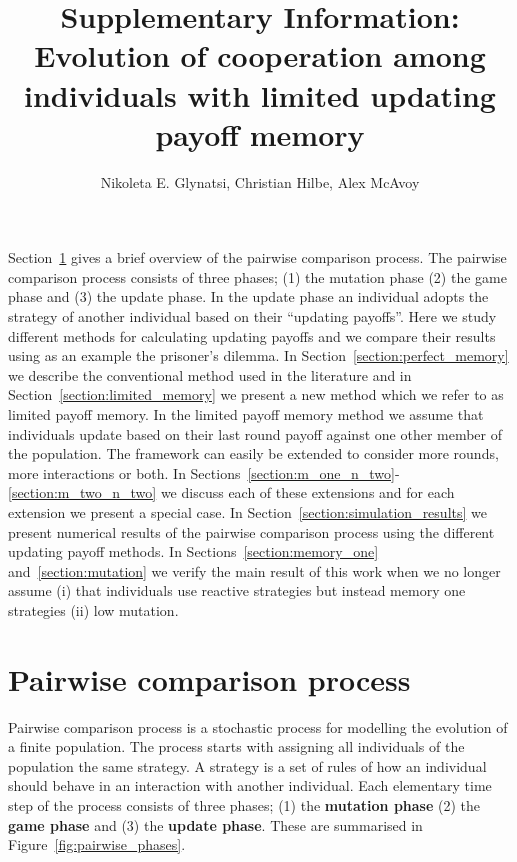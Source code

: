 \documentclass[11pt]{article}
\title{\bf  \sffamily \LARGE Supplementary Information: Evolution of cooperation among individuals with
limited updating payoff memory\\}
\date{}
\author{Nikoleta E. Glynatsi, Christian Hilbe, Alex McAvoy}
\theoremstyle{plainCl1}
\theoremstyle{plainCl2}
\begin{document}
\maketitle

Section~\ref{section:pairwise_comparison} gives a brief overview of the pairwise
comparison process. The pairwise comparison process consists of three phases;
(1) the mutation phase (2) the game phase and (3) the update phase. In the
update phase an individual adopts the strategy of another individual based on
their ``updating payoffs''. Here we study different methods for calculating
updating payoffs and we compare their results using as an example the prisoner's
dilemma. In Section~\ref{section:perfect_memory} we describe the conventional
method used in the literature and in Section~\ref{section:limited_memory} we
present a new method which we refer to as 
limited payoff memory. In the limited payoff memory method we assume that
individuals update based on their last round payoff against one other member of
the population. The framework can easily be extended to consider more rounds,
more interactions or both. In
Sections~\ref{section:m_one_n_two}-\ref{section:m_two_n_two} we discuss each of
these extensions and for each extension we present a special case.
In Section~\ref{section:simulation_results} we present numerical results of the
pairwise comparison process using the different updating payoff methods.
In Sections~\ref{section:memory_one} and~\ref{section:mutation} we
verify the main result of this work when we no longer assume (i) that
individuals use reactive strategies but instead memory one strategies (ii) low
mutation.

\section{Pairwise comparison process}\label{section:pairwise_comparison}

Pairwise comparison process is a stochastic process for modelling the evolution
of a finite population. The process starts with assigning all individuals of the
population the same strategy. A strategy is a set of rules of how an individual
should behave in an interaction with another individual. Each elementary time
step of the process consists of three phases; (1) the \textbf{mutation phase}
(2) the \textbf{game phase} and (3) the \textbf{update phase}. These are summarised
in Figure~\ref{fig:pairwise_phases}.
\end{document}
